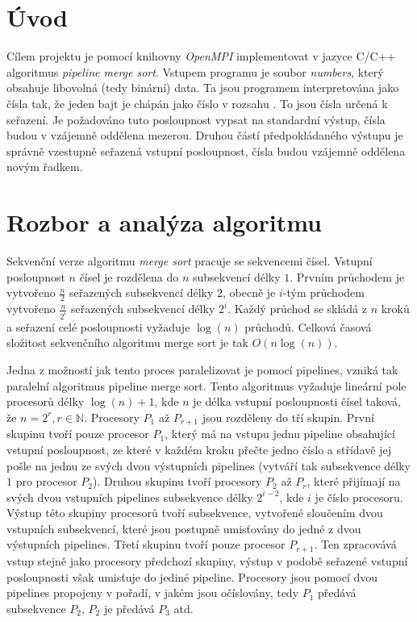 \documentclass[a4paper, 12pt]{article}[21.3.2015]
\begin{document}


\tableofcontents

\clearpage
\section{Úvod} \label{introduction}
Cílem projektu je pomocí knihovny \emph{OpenMPI} implementovat v jazyce C/C++ algoritmus \emph{pipeline merge sort}. Vstupem programu je soubor \emph{numbers}, který obsahuje libovolná (tedy binární) data. Ta jsou programem interpretována jako čísla tak, že jeden bajt je chápán jako číslo v rozsahu \(<0-255>\). To jsou čísla určená k seřazení. Je požadováno tuto posloupnost vypsat na standardní výstup, čísla budou v vzájemně oddělena mezerou. Druhou částí předpokládaného výstupu je správně vzestupně seřazená vstupní posloupnost, čísla budou vzájemně oddělena novým řadkem.

\section{Rozbor a analýza algoritmu} \label{analysis}
Sekvenční verze algoritmu \emph{merge sort} pracuje se sekvencemi čísel. Vstupní posloupnost \(n\) čísel je rozdělena do \(n\) subsekvencí délky \(1\). Prvním průchodem je vytvořeno \(\frac{n}{2}\) seřazených subsekvencí délky \(2\), obecně je \(i\)-tým průchodem vytvořeno \(\frac{n}{2^i}\) seřazených subsekvencí délky \(2^i\). Každý průchod se skládá z \(n\) kroků a seřazení celé posloupnosti vyžaduje \(\log(n)\) průchodů. Celková časová složitost sekvenčního algoritmu merge sort je tak \(O(n\log(n))\).

Jedna z možností jak tento proces paralelizovat je pomocí pipelines, vzniká tak paralelní algoritmus pipeline merge sort. Tento algoritmus vyžaduje lineární pole procesorů délky \(\log(n) + 1\), kde \(n\) je délka vstupní posloupnosti čísel taková, že \(n = 2^r, r \in \mathbb{N}\). Procesory \(P_1\) až \(P_{r + 1}\) jsou rozděleny do tří skupin. První skupinu tvoří pouze procesor \(P_1\), který má na vstupu jednu pipeline obsahující vstupní posloupnost, ze které v každém kroku přečte jedno číslo a střídavě jej pošle na jednu ze svých dvou výstupních pipelines (vytváří tak subsekvence délky \(1\) pro procesor \(P_2\)). Druhou skupinu tvoří procesory \(P_2\) až \(P_r\), které přijímají na svých dvou vstupních pipelines subsekvence délky \(2^{i-2}\), kde \(i\) je číslo procesoru. Výstup této skupiny procesorů tvoří subsekvence, vytvořené sloučením dvou vstupních subsekvencí, které jsou postupně umisťovány do jedné z dvou výstupních pipelines. Třetí skupinu tvoří pouze procesor \(P_{r + 1}\). Ten zpracovává vstup stejně jako procesory předchozí skupiny, výstup v podobě seřazené vstupní posloupnosti však umisťuje do jediné pipeline. Procesory jsou pomocí dvou pipelines propojeny v pořadí, v jakém jsou očíslovány, tedy \(P_1\) předává subsekvence \(P_2\), \(P_2\) je předává \(P_3\) atd.
\end{document}
